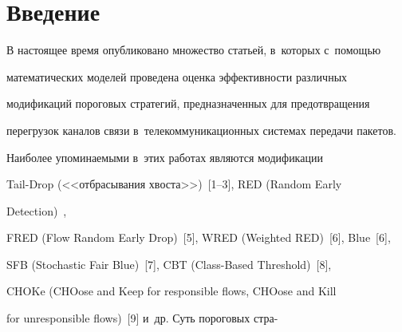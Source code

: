   


















      \thispagestyle{headings}


      


      \vspace*{-18pt}


  


  \section{Введение}


  


  В настоящее время опубликовано множество статьей, в~которых с~помощью 


математических моделей проведена оценка эффективности различных 


модификаций пороговых стратегий, предназначенных для предотвращения 


перегрузок каналов связи в~телекоммуникационных системах передачи пакетов. 


Наиболее упоминаемыми в~этих работах являются модификации  


Tail-Drop (<<отбрасывания хвоста>>)~[1--3], RED (Random Early 


Detection)~\cite{1-ag, 4-ag}, 


FRED (Flow Random Early Drop)~[5], WRED (Weighted RED)~[6], Blue~[6], 


SFB (Stochastic Fair Blue)~[7], CBT (Class-Based Threshold)~[8], 


CHOKe (CHOose and Keep for responsible flows, CHOose and Kill


for unresponsible flows)~[9] и~др. Суть пороговых стра-\linebreak


\vspace*{-12pt}





\pagebreak





